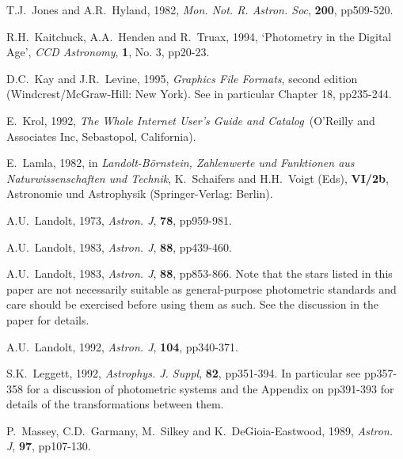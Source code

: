 \documentclass[twoside,11pt,nolof]{starlink}
\begin{document}
\begin{thebibliography}{99}
   T.J.~Jones and A.R.~Hyland, 1982, \textit{Mon. Not. R.
   Astron. Soc}, \textbf{200}, pp509-520.

   R.H.~Kaitchuck, A.A.~Henden and R.~Truax,
   1994, `Photometry in the Digital Age', \textit{CCD Astronomy}, \textbf{1},
   No. 3, pp20-23.

   D.C.~Kay and J.R.~Levine, 1995, \textit{Graphics File
   Formats}, second edition
  \newline (Windcrest/McGraw-Hill: New York).  See in particular
   Chapter 18, pp235-244.

   E.~Krol, 1992, \textit{The Whole Internet User's Guide
   and Catalog}\, (O'Reilly and Associates Inc, Sebastopol, California).

   E.~Lamla, 1982, in \textit{Landolt-B\"{o}rnstein,
   Zahlenwerte und Funktionen aus Naturwissenschaften und Technik},
   K.~Schaifers and H.H.~Voigt (Eds), \textbf{VI/2b}, Astronomie und
   Astrophysik (Springer-Verlag: Berlin).

   A.U.~Landolt, 1973, \textit{Astron. J}, \textbf{78},
   pp959-981.

   A.U.~Landolt, 1983, \textit{Astron. J}, \textbf{88},
   pp439-460.

   A.U.~Landolt, 1983, \textit{Astron. J}, \textbf{88},
   pp853-866.  Note that the stars listed in this paper are not
   necessarily suitable as general-purpose photometric standards and
   care  should be exercised before using them as such.  See the
   discussion in the paper for details.

   A.U.~Landolt, 1992, \textit{Astron. J}, \textbf{104},
   pp340-371.

   S.K.~Leggett, 1992, \textit{Astrophys. J. Suppl}, \textbf{82}, pp351-394.  In particular see pp357-358 for a discussion of
   photometric systems and the Appendix on pp391-393 for details of the
   transformations between them.

   P.~Massey, C.D.~Garmany, M.~Silkey and
   K.~DeGioia-Eastwood, 1989, \textit{Astron. J}, \textbf{97}, pp107-130.


\end{thebibliography}
\end{document}
